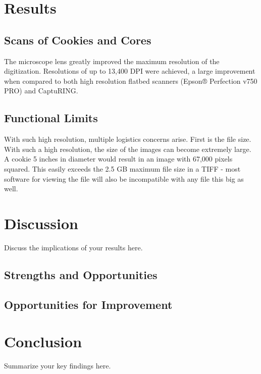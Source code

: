 \documentclass[a4paper,12pt]{article}
\begin{document}
\section{Results}
\subsection{Scans of Cookies and Cores}
The microscope lens greatly improved the maximum resolution of the digitization. Resolutions of up to 13,400 DPI were achieved, a large improvement when compared to 
both high resolution flatbed scanners (Epson® Perfection v750 PRO) and CaptuRING. 

\subsection{Functional Limits}
With such high resolution, multiple logistics concerns arise. First is the file size. With such a high resolution, the size of the images can become extremely large. A cookie
5 inches in diameter would result in an image with 67,000 pixels squared. This easily exceeds the 2.5 GB maximum file size in a TIFF - most software for viewing the file will also 
be incompatible with any file this big as well. 


\section{Discussion}
Discuss the implications of your results here.

\subsection{Strengths and Opportunities}

\subsection{Opportunities for Improvement}

\section{Conclusion}
Summarize your key findings here.



\end{document}
